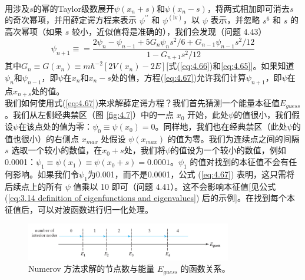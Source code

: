     \\
    \indent 用涉及$s$的幂的Taylor级数展开$\psi\left(x_n+s\right)$和$\psi\left(x_n-s\right)$，将两式相加即可消去$s$的奇次幂项，并用薛定谔方程来表示 $\psi^{\prime\prime}$ 和 $\psi^{\left(\mathrm{iv}\right)}$，以 $\psi$ 表示，并忽略 $s^6$ 和 $s$ 的高次幂项（如果 $s$ 较小，近似值将是准确的），我们会发现（问题 4.43）
    \begin{equation}
        \psi_{n+1} \equiv = \frac{
            2\psi_n - \psi_{n-1} + 5G_n\psi_n s^2/6 + G_{n-1}\psi_{n-1}s^2/12
        }{
            1-G_{n+1}s^2/12
        }
        \label{eq:4.67}
    \end{equation}
    其中$G_n \equiv G\left(x_n\right) \equiv m\hbar^{-2}\left[2V\left(x_n\right)-2E\right]$[式(\ref{eq:4.66})和\ref{eq:4.65}]。如果知道$\psi_n$和$\psi_{n-1}$，即$\psi$在$x_n$和$x_n-s$处的值，方程(\ref{eq:4.67})允许我们计算$\psi_{n+1}$，即$\psi$在点$x_{n+s}$处的值。\\
    \indent 我们如何使用式(\ref{eq:4.67})来求解薛定谔方程？我们首先猜测一个能量本征值$E_{guess}$。我们从左侧经典禁区（图 \ref{fig:4.7}）中的一点 $x_0$ 开始，此处$\psi$的值很小，我们假设$\psi$在该点处的值为零：$\psi_0 \equiv \psi\left(x_0\right) = 0$。同样地，我们也在经典禁区（此处$\psi$的值也很小）的右侧点 $x_{max}$ 处假设 $\psi\left(x_{max}\right)$ 的值为零。我们为连续点之间的间隔 $s$ 选取一个较小的数值，在$x_0+s$处，我们将$\psi$的值设为一个较小的数值，例如0.0001：$\psi_1 \equiv \psi\left(x_1\right) \equiv \psi\left(x_0+s\right) = 0.0001$。$\psi_1$ 的值对找到的本征值不会有任何影响。如果我们令$\psi_1$为0.001，而不是0.0001，公式 (\ref{eq:4.67}) 表明，这只需将后续点上的所有 $\psi$ 值乘以 10 即可（问题 4.41）。这不会影响本征值[见公式 (\ref{eq:3.14 definition of eigenfunctions and eigenvalues}) 后的示例]。在找到每个本征值后，可以对波函数进行归一化处理。\\
    \begin{figure}[h!]
        \centering
        \includegraphics[width=0.8\textwidth]{Figures/4.8.png}
        \caption{Numerov 方法求解的节点数与能量 $E_{guess}$ 的函数关系。}
        \label{fig:4.8}
    \end{figure}\\
